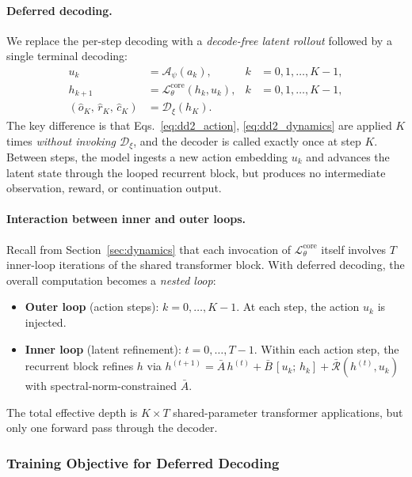 \paragraph{Deferred decoding.}
We replace the per-step decoding with a \emph{decode-free latent rollout} followed by a single terminal decoding:
\begin{align}
  u_k &= \mathcal{A}_\psi(a_k),
    &k &= 0, 1, \ldots, K-1, \label{eq:dd2_action} \\
  h_{k+1} &= \mathcal{L}_\theta^{\mathrm{core}}(h_k, u_k),
    &k &= 0, 1, \ldots, K-1, \label{eq:dd2_dynamics} \\
  (\hat{o}_{K},\, \hat{r}_{K},\, \hat{c}_{K}) &=
    \mathcal{D}_\xi(h_K). \label{eq:dd2_final_decode}
\end{align}
The key difference is that Eqs.~\eqref{eq:dd2_action}, \eqref{eq:dd2_dynamics} are applied $K$ times \emph{without invoking $\mathcal{D}_\xi$}, and the decoder is called exactly once at step $K$. Between steps, the model ingests a new action embedding $u_k$ and advances the latent state through the looped recurrent block, but produces no intermediate observation, reward, or continuation output.

\paragraph{Interaction between inner and outer loops.}
Recall from Section~\ref{sec:dynamics} that each invocation of $\mathcal{L}_\theta^{\mathrm{core}}$ itself involves $T$ inner-loop iterations of the shared transformer block.  With deferred decoding, the overall computation becomes a \emph{nested loop}:
\begin{itemize}
  \item \textbf{Outer loop} (action steps): $k = 0, \ldots, K-1$.
    At each step, the action $u_k$ is injected.
  \item \textbf{Inner loop} (latent refinement): $t = 0, \ldots, T-1$.
    Within each action step, the recurrent block refines $h$ via
    $h^{(t+1)} = \bar{A}\,h^{(t)} + \bar{B}\,[u_k;\, h_k]
    + \bar{\mathcal{R}}(h^{(t)}, u_k)$
    with spectral-norm-constrained $\bar{A}$.
\end{itemize}
The total effective depth is $K \times T$ shared-parameter transformer applications, but only one forward pass through the decoder.

\subsubsection{Training Objective for Deferred Decoding}
\label{sec:dd_training}

